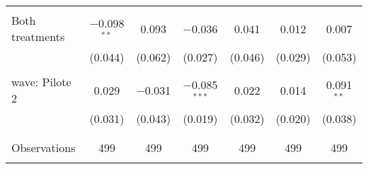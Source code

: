 \begin{tabular}{@{\extracolsep{5pt}}lcccccc}
  & & & & & & \\ 
 Both treatments & $-$0.098$^{**}$ & 0.093 & $-$0.036 & 0.041 & 0.012 & 0.007 \\ 
  & (0.044) & (0.062) & (0.027) & (0.046) & (0.029) & (0.053) \\ 
  & & & & & & \\ 
 wave: Pilote 2 & 0.029 & $-$0.031 & $-$0.085$^{***}$ & 0.022 & 0.014 & 0.091$^{**}$ \\ 
  & (0.031) & (0.043) & (0.019) & (0.032) & (0.020) & (0.038) \\ 
  & & & & & & \\ 
\hline \\[-1.8ex] 

Observations & 499 & 499 & 499 & 499 & 499 & 499 \\ 
\hline 
\hline \\[-1.8ex] 
\end{tabular} 